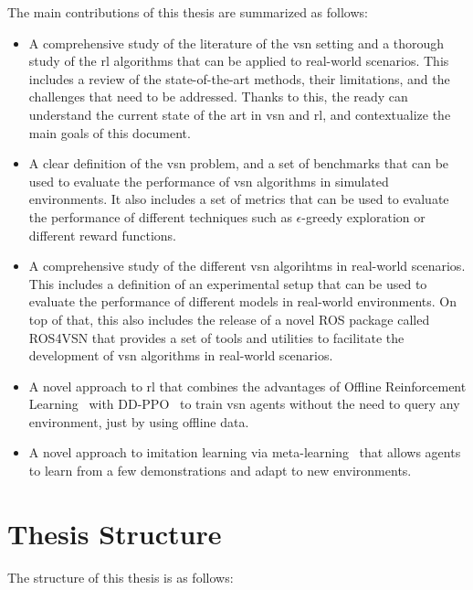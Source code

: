 The main contributions of this thesis are summarized as follows:
\begin{itemize}
    \item A comprehensive study of the literature of the \acrshort{vsn} setting and a thorough study of the \acrshort{rl} algorithms that can be applied to real-world scenarios.
    This includes a review of the state-of-the-art methods, their limitations, and the challenges that need to be addressed.
    Thanks to this, the ready can understand the current state of the art in \acrshort{vsn} and \acrshort{rl}, and contextualize the main goals of this document.
    \item A clear definition of the \acrshort{vsn} problem, and a set of benchmarks that can be used to evaluate the performance of \acrshort{vsn} algorithms in simulated environments.
    It also includes a set of metrics that can be used to evaluate the performance of different techniques such as $\epsilon$-greedy exploration or different reward functions.
    \item A comprehensive study of the different \acrshort{vsn} algorihtms in real-world scenarios.
    This includes a definition of an experimental setup that can be used to evaluate the performance of different models in real-world environments.
    On top of that, this also includes the release of a novel ROS package called ROS4VSN that provides a set of tools and utilities to facilitate the development of \acrshort{vsn} algorithms in real-world scenarios.
    \item A novel approach to \acrshort{rl} that combines the advantages of Offline Reinforcement Learning~\cite{levine2020} with DD-PPO~\cite{Wijmans2019DDPPOLN} to train \acrshort{vsn} agents without the need to query any environment, just by using offline data.
    \item A novel approach to imitation learning via meta-learning~\cite{finnOneShotVisualImitation2017} that allows agents to learn from a few demonstrations and adapt to new environments.
\end{itemize}

\section{Thesis Structure}\label{sec:thesis-structure}

The structure of this thesis is as follows:


